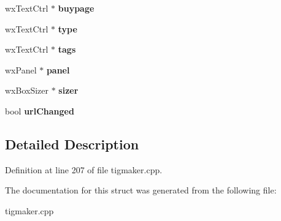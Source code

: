\begin{DoxyCompactItemize}
\item 
\hypertarget{struct_the_frame_ada2dd050eda7659c3a68572ce52422db}{wx\-Text\-Ctrl $\ast$ {\bfseries buypage}}\label{struct_the_frame_ada2dd050eda7659c3a68572ce52422db}

\item 
\hypertarget{struct_the_frame_a2b2b76468fa284d39c1bc21c67dfdcde}{wx\-Text\-Ctrl $\ast$ {\bfseries type}}\label{struct_the_frame_a2b2b76468fa284d39c1bc21c67dfdcde}

\item 
\hypertarget{struct_the_frame_a091ebeaec82a9703c898eb7ffd0c9fe5}{wx\-Text\-Ctrl $\ast$ {\bfseries tags}}\label{struct_the_frame_a091ebeaec82a9703c898eb7ffd0c9fe5}

\item 
\hypertarget{struct_the_frame_ac30c1cecc3315fa527fdc333b4f18dde}{wx\-Panel $\ast$ {\bfseries panel}}\label{struct_the_frame_ac30c1cecc3315fa527fdc333b4f18dde}

\item 
\hypertarget{struct_the_frame_ac54ac3f656876082566591d9622323e0}{wx\-Box\-Sizer $\ast$ {\bfseries sizer}}\label{struct_the_frame_ac54ac3f656876082566591d9622323e0}

\item 
\hypertarget{struct_the_frame_a31d1e4b9cd1fa6fc9be8eb4f1484d561}{bool {\bfseries url\-Changed}}\label{struct_the_frame_a31d1e4b9cd1fa6fc9be8eb4f1484d561}

\end{DoxyCompactItemize}


\subsection{Detailed Description}


Definition at line 207 of file tigmaker.\-cpp.



The documentation for this struct was generated from the following file\-:\begin{DoxyCompactItemize}
\item 
tigmaker.\-cpp\end{DoxyCompactItemize}
